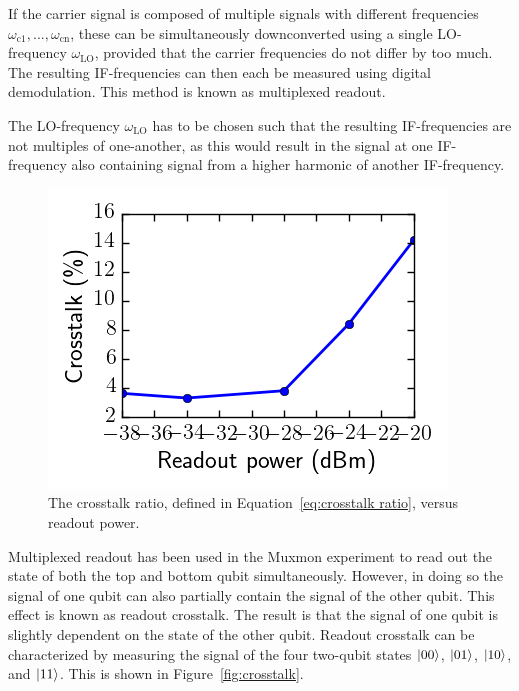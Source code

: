           If the carrier signal is composed of multiple signals with different frequencies $\omega_\text{c1}, ..., \omega_\text{cn}$, these can be simultaneously downconverted using a single LO-frequency $\omega_\text{LO}$, provided that the carrier frequencies do not differ by too much. The resulting IF-frequencies can then each be measured using digital demodulation. This method is known as multiplexed readout.

          The LO-frequency $\omega_\text{LO}$ has to be chosen such that the resulting IF-frequencies are not multiples of one-another, as this would result in the signal at one IF-frequency also containing signal from a higher harmonic of another IF-frequency.

          \begin{figure}
            \begin{center}
            \vspace{-30pt}
              \includegraphics[width=\textwidth]{../Figures/Calibration routines/crosstalk ratio.png}
            \end{center}
            \vspace{-20 pt}
            \caption{The crosstalk ratio, defined in Equation~\ref{eq:crosstalk ratio}, versus readout power.}
            \label{fig:crosstalk ratio}
          \end{figure}

          Multiplexed readout has been used in the Muxmon experiment to read out the state of both the top and bottom qubit simultaneously. However, in doing so the signal of one qubit can also partially contain the signal of the other qubit. This effect is known as readout crosstalk. The result is that the signal of one qubit is slightly dependent on the state of the other qubit. Readout crosstalk can be characterized by measuring the signal of the four two-qubit states $\ket{00}$, $\ket{01}$, $\ket{10}$, and $\ket{11}$. This is shown in Figure~\ref{fig:crosstalk}.

